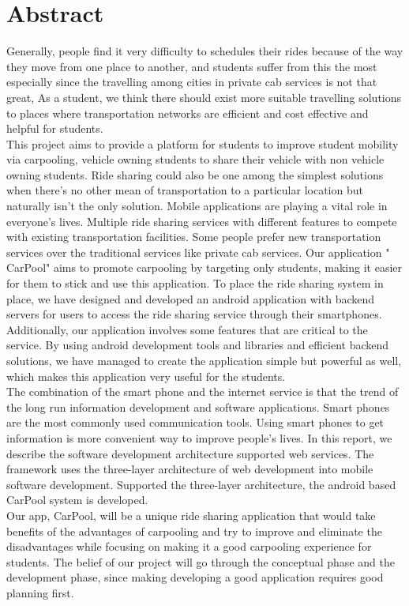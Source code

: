 \chapter*{Abstract}
Generally, people find it very difficulty to schedules their rides because of the way they move from one place to another, and students suffer from this the most  especially since the travelling among cities in private cab services is not that great, As a student, we think there should exist more suitable travelling solutions to places where transportation networks are efficient and cost effective and helpful for students.\\ 

This  project  aims to provide a  platform  for students to improve student  mobility  via carpooling, vehicle owning students to share their vehicle with non vehicle owning students. Ride sharing could also be one among the simplest solutions when there's no other  mean  of  transportation  to a  particular location  but naturally isn't the only solution. Mobile applications are playing a vital role in everyone’s  lives. Multiple ride sharing services with different features to compete with existing transportation facilities. Some people prefer new transportation services over the  traditional services like  private cab  services. Our application " CarPool"  aims  to  promote  carpooling  by  targeting  only students, making it easier for them to stick and use this application.  To place the ride sharing system in place, we have designed and developed an android application with backend servers for users  to  access  the ride sharing service through their smartphones. Additionally, our application  involves  some  features  that  are  critical to the service. By using android development tools and libraries and efficient backend solutions, we have managed to create the application simple but powerful as well, which makes this application very useful for the students.\\ 

The combination of the smart phone and the internet service is that the trend of the long run information development and software applications. Smart phones are the most commonly used communication tools. Using smart phones to get information is more convenient way to improve people's lives. In this report, we describe the software development architecture supported web services. The framework uses the three-layer architecture of web development into mobile software development. Supported the three-layer architecture, the android based CarPool system is developed.\\ 

Our app, CarPool, will be a unique ride sharing application that would take benefits of the advantages of carpooling and try to improve and eliminate the disadvantages while focusing on making it a good carpooling experience for students. The belief of our project will go through the conceptual phase and the development phase, since making developing a good application requires good planning first.